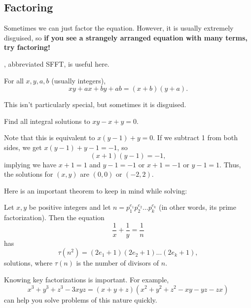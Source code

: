 \documentclass{article}
\begin{document}
\subsection{Factoring}
Sometimes we can just factor the equation. However, it is usually extremely disguised, so \textbf{if you see a strangely arranged equation with many terms, try factoring!}

, abbreviated SFFT, is useful here.
\begin{theo}[SFFT]
For all $x,y,a,b$ (usually integers),
$$xy+ax+by+ab=(x+b)(y+a).$$
\end{theo}
This isn't particularly special, but sometimes it is disguised.
\begin{exam}
Find all integral solutions to $xy-x+y=0$.
\end{exam}
\begin{sol}
Note that this is equivalent to $x(y-1)+y=0$. If we subtract 1 from both sides, we get $x(y-1)+y-1=-1$, so
$$(x+1)(y-1)=-1,$$
implying we have $x+1=1$ and $y-1=-1$ or $x+1=-1$ or $y-1=1$. Thus, the solutions for $(x,y)$ are $\boxed{(0,0)}$ or $\boxed{(-2,2)}$.
\end{sol}
Here is an important theorem to keep in mind while solving:
\begin{theo}
Let $x,y$ be positive integers and let $n=p_1^{e_1}p_2^{e_2}\ldots p_k^{e_k}$ (in other words, its prime factorization). Then the equation
$$\frac{1}{x}+\frac{1}{y}=\frac{1}{n}$$
has
$$\tau(n^2) = (2e_1+1)(2e_2+1)\ldots(2e_k+1),$$
solutions, where $\tau(n)$ is the number of divisors of $n$.
\end{theo}
Knowing key factorizations is important. For example,
$$x^3+y^3+z^3-3xyz=(x+y+z)(x^2+y^2+z^2-xy-yz-zx)$$
can help you solve problems of this nature quickly.
\end{document}
